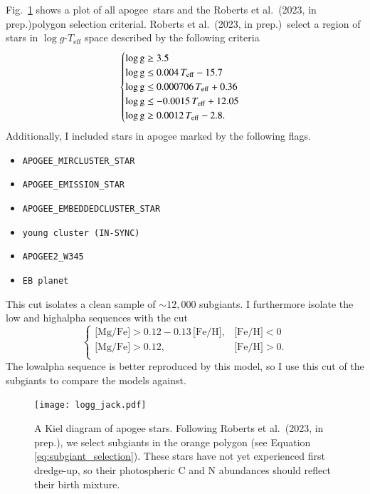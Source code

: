 \documentclass[12pt,oneside,letterpaper]{report}
\newcommand{\apogee}{\gls{apogee}}
\newcommand{\citetjack}{Roberts et al.~(2023, in prep.)}
\newcommand{\about}[1]{${\sim} #1$}
\begin{document}
Fig.~\ref{fig:subgiant_selection} shows a plot of all \apogee\ stars and the \citetjack polygon selection criterial. 
 \citetjack~select a region of stars in $\log g$-$T_\text{eff}$ space described by the following criteria
 \begin{equation}
    \begin{cases} \label{eq:subgiant_selection}
        \log \text{g} \geq 3.5 \\
        \log \text{g} \leq 0.004\,T_{\rm eff} - 15.7 \\
        \log \text{g} \leq 0.000706\,T_{\rm eff} + 0.36 \\
        \log \text{g} \leq -0.0015\,T_{\rm eff} + 12.05 \\
        \log \text{g} \geq 0.0012\,T_{\rm eff} - 2.8. \\
    \end{cases}
\end{equation}
Additionally, I included stars in \apogee{} marked by the following flags.
\begin{itemize}
\item \verb|APOGEE_MIRCLUSTER_STAR|
\item \verb|APOGEE_EMISSION_STAR|
\item \verb|APOGEE_EMBEDDEDCLUSTER_STAR|
\item \verb|young cluster (IN-SYNC)|
\item \verb|APOGEE2_W345|
\item \verb|EB planet|
\end{itemize}
This cut isolates a clean sample of \about{12,000} \gls{subgiant}s.
I furthermore isolate the low and \gls{highalpha} sequences with the cut
\begin{equation}\label{eq:high_alpha}
\begin{cases}
\text{[Mg/Fe]} >0.12-0.13\,\text{[Fe/H]}, & \text{[Fe/H]}<0\\
\text{[Mg/Fe]} >0.12, & \text{[Fe/H]}>0. \\
\end{cases}
\end{equation}
The \gls{lowalpha} sequence is better reproduced by this model, so I use this cut of the subgiants to compare the models against. 




\begin{figure}
    \centering
    \texttt{[image: logg\_jack.pdf]}
    \caption[Subgiant selection]{
        A Kiel diagram of \apogee{} stars. Following \citetjack, we select \gls{subgiant}s in the orange polygon (see Equation \ref{eq:subgiant_selection}). These stars have not yet experienced first dredge-up, so their photospheric C and N abundances should reflect their birth mixture.
    }
    \label{fig:subgiant_selection}
\end{figure}
\end{document}
